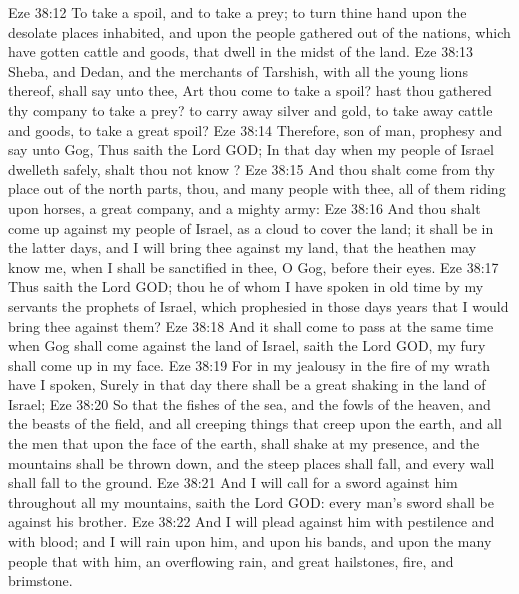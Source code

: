 \vs Eze 38:12 To take a spoil, and to take a prey; to turn thine hand upon the desolate places  inhabited, and upon the people  gathered out of the nations, which have gotten cattle and goods, that dwell in the midst of the land.
\vs Eze 38:13 Sheba, and Dedan, and the merchants of Tarshish, with all the young lions thereof, shall say unto thee, Art thou come to take a spoil? hast thou gathered thy company to take a prey? to carry away silver and gold, to take away cattle and goods, to take a great spoil?
\vs Eze 38:14 Therefore, son of man, prophesy and say unto Gog, Thus saith the Lord GOD; In that day when my people of Israel dwelleth safely, shalt thou not know ?
\vs Eze 38:15 And thou shalt come from thy place out of the north parts, thou, and many people with thee, all of them riding upon horses, a great company, and a mighty army:
\vs Eze 38:16 And thou shalt come up against my people of Israel, as a cloud to cover the land; it shall be in the latter days, and I will bring thee against my land, that the heathen may know me, when I shall be sanctified in thee, O Gog, before their eyes.
\vs Eze 38:17 Thus saith the Lord GOD;  thou he of whom I have spoken in old time by my servants the prophets of Israel, which prophesied in those days  years that I would bring thee against them?
\vs Eze 38:18 And it shall come to pass at the same time when Gog shall come against the land of Israel, saith the Lord GOD,  my fury shall come up in my face.
\vs Eze 38:19 For in my jealousy  in the fire of my wrath have I spoken, Surely in that day there shall be a great shaking in the land of Israel;
\vs Eze 38:20 So that the fishes of the sea, and the fowls of the heaven, and the beasts of the field, and all creeping things that creep upon the earth, and all the men that  upon the face of the earth, shall shake at my presence, and the mountains shall be thrown down, and the steep places shall fall, and every wall shall fall to the ground.
\vs Eze 38:21 And I will call for a sword against him throughout all my mountains, saith the Lord GOD: every man's sword shall be against his brother.
\vs Eze 38:22 And I will plead against him with pestilence and with blood; and I will rain upon him, and upon his bands, and upon the many people that  with him, an overflowing rain, and great hailstones, fire, and brimstone.
